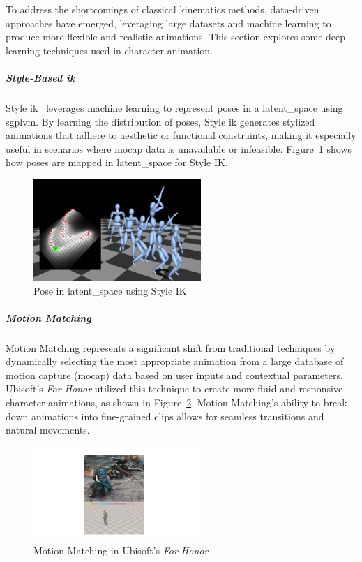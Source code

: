 \documentclass[../../main.tex]{subfiles}
\begin{document}
To address the shortcomings of classical kinematics methods, data-driven approaches have emerged, leveraging large datasets and machine learning to produce more flexible and realistic animations. This section explores some deep learning techniques used in character animation.

\subparagraph{Style-Based \gls{ik}}
\label{ch:background_work:sign_language_synthesis:3d_techniques:avatar_animation:deep_learning:style_ik}

Style \gls{ik}~\cite{grochow2004style} leverages machine learning to represent poses in a \gls{latent_space} using \gls{sgplvm}. By learning the distribution of poses, Style \gls{ik} generates stylized animations that adhere to aesthetic or functional constraints, making it especially useful in scenarios where mocap data is unavailable or infeasible. Figure~\ref{fig:style_ik} shows how poses are mapped in \gls{latent_space} for Style IK.

\begin{figure}
  \centering \includegraphics[width = 2.5in]{chapters/pose_correction/images/style_ik.png}
  \caption{Pose in \gls{latent_space} using Style IK}
  \label{fig:style_ik}
\end{figure}

\subparagraph{Motion Matching}
\label{ch:background_work:sign_language_synthesis:3d_techniques:avatar_animation:deep_learning:motion_matching}

Motion Matching represents a significant shift from traditional techniques by dynamically selecting the most appropriate animation from a large database of motion capture (mocap) data based on user inputs and contextual parameters. Ubisoft's \emph{For Honor} utilized this technique to create more fluid and responsive character animations, as shown in Figure~\ref{fig:for_honor}. Motion Matching's ability to break down animations into fine-grained clips allows for seamless transitions and natural movements.

\begin{figure}
  \centering \includegraphics[width = 2.5in]{chapters/pose_correction/images/for_honor.png}
  \caption{Motion Matching in Ubisoft’s \emph{For Honor}}
  \label{fig:for_honor}
\end{figure}
\end{document}
